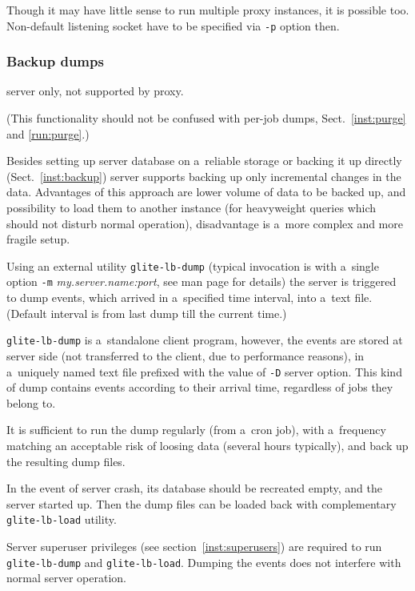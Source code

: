 Though it may have little sense to run multiple \LB proxy instances, it is possible too.
Non-default listening socket have to be specified via \verb'-p' option then.



\subsubsection{Backup dumps}
\label{run:dump}

\LB server only, not supported by proxy.

(This functionality should not be confused with per-job dumps, Sect.~\ref{inst:purge} and \ref{run:purge}.)

Besides setting up \LB server database on a~reliable storage or
backing it up directly (Sect.~\ref{inst:backup})
\LB server supports backing up only incremental changes in the data.
Advantages of this approach are lower volume of data to be backed up,
and possibility to load them to another instance (\eg for heavyweight
queries which should not disturb normal operation), disadvantage is
a~more complex and more fragile setup. 

Using an external utility \verb'glite-lb-dump' (typical invocation is with
a~single option \verb'-m' \emph{my.server.name:port}, see man page for
details) the server is triggered to dump events, which arrived in
a~specified time interval, into a~text file. (Default interval is from last
dump till the current time.)

\verb'glite-lb-dump' is a~standalone client program, however, 
the events are stored at server side (\ie not transferred to the client,
due to performance reasons),
in a~uniquely named text
file prefixed with the value of \verb'-D' server option. This kind of dump
contains events according to their arrival time, regardless of jobs they belong
to.

It is sufficient to run the dump regularly (from a~cron job), with a~frequency
matching an acceptable risk of loosing data (several hours typically), and back
up the resulting dump files. 

In the event of server crash, its database should be recreated empty,
and the server started up.
Then the dump files can be loaded back with complementary
\verb'glite-lb-load' utility.

Server superuser privileges (see section~\ref{inst:superusers}) are required to run \verb'glite-lb-dump' and \verb'glite-lb-load'.
Dumping the events does not interfere with normal server operation.

